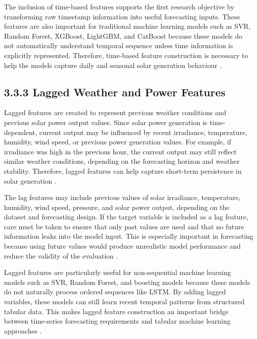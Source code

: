 The inclusion of time-based features supports the first research objective by transforming raw timestamp information into useful forecasting inputs. These features are also important for traditional machine learning models such as SVR, Random Forest, XGBoost, LightGBM, and CatBoost because these models do not automatically understand temporal sequence unless time information is explicitly represented. Therefore, time-based feature construction is necessary to help the models capture daily and seasonal solar generation behaviour \parencite{JnanaVarshitha2025, Eren2025, Alhassan2025}.

\subsection{3.3.3 Lagged Weather and Power Features}

Lagged features are created to represent previous weather conditions and previous solar power output values. Since solar power generation is time-dependent, current output may be influenced by recent irradiance, temperature, humidity, wind speed, or previous power generation values. For example, if irradiance was high in the previous hour, the current output may still reflect similar weather conditions, depending on the forecasting horizon and weather stability. Therefore, lagged features can help capture short-term persistence in solar generation \parencite{JnanaVarshitha2025, Eren2025, TsaiLo2025}.

The lag features may include previous values of solar irradiance, temperature, humidity, wind speed, pressure, and solar power output, depending on the dataset and forecasting design. If the target variable is included as a lag feature, care must be taken to ensure that only past values are used and that no future information leaks into the model input. This is especially important in forecasting because using future values would produce unrealistic model performance and reduce the validity of the evaluation \parencite{Duvuru2026, ArellanosTafur2025, CarvalhoJunior2025}.

Lagged features are particularly useful for non-sequential machine learning models such as SVR, Random Forest, and boosting models because these models do not naturally process ordered sequences like LSTM. By adding lagged variables, these models can still learn recent temporal patterns from structured tabular data. This makes lagged feature construction an important bridge between time-series forecasting requirements and tabular machine learning approaches \parencite{JnanaVarshitha2025, Bakht2025, Alhassan2025}.

